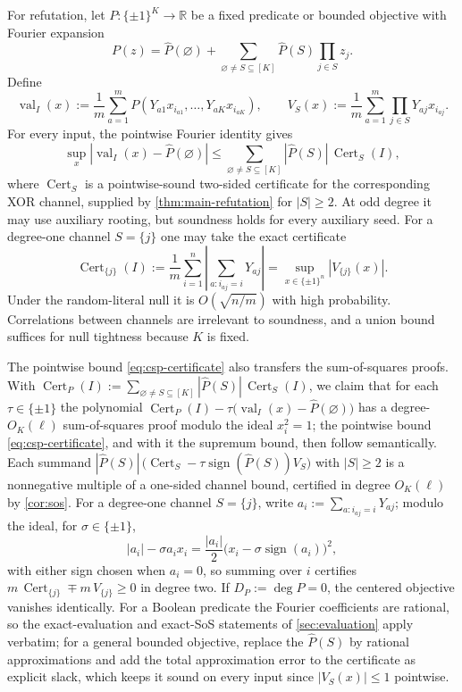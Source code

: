 \documentclass[11pt]{article}
\theoremstyle{definition}
\theoremstyle{remark}
\newcommand{\1}{\mathbf 1}
\DeclareMathOperator{\sign}{sign}
\DeclareMathOperator{\Cert}{Cert}
\DeclareMathOperator{\val}{val}
\numberwithin{equation}{section}
\begin{document}
For refutation, let $P:\{\pm1\}^K\to\mathbb R$ be a fixed predicate or
bounded objective with Fourier expansion
\begin{equation}\label{eq:predicate-fourier}
 P(z)=\widehat P(\varnothing)
 +\sum_{\varnothing\ne S\subseteq[K]}
   \widehat P(S)\prod_{j\in S}z_j.
\end{equation}
Define
\[
 \val_I(x):=\frac1m\sum_{a=1}^m
 P(Y_{a1}x_{i_{a1}},\ldots,Y_{aK}x_{i_{aK}}),
 \qquad
 V_S(x):=\frac1m\sum_{a=1}^m
 \prod_{j\in S}Y_{aj}x_{i_{aj}}.
\]
For every input, the pointwise Fourier identity gives
\begin{equation}\label{eq:csp-certificate}
 \sup_x\left|\val_I(x)-\widehat P(\varnothing)\right|
 \le\sum_{\varnothing\ne S\subseteq[K]}
       |\widehat P(S)|\,\Cert_S(I),
\end{equation}
where $\Cert_S$ is a pointwise-sound two-sided certificate for the
corresponding XOR channel, supplied by \cref{thm:main-refutation} for
$|S|\ge2$.  At odd degree it may use auxiliary rooting, but soundness holds
for every auxiliary seed.  For a degree-one channel $S=\{j\}$ one may take
the exact certificate
\begin{equation}\label{eq:degree-one-certificate}
 \Cert_{\{j\}}(I)
 :=\frac1m\sum_{i=1}^n
 \left|\sum_{a:i_{aj}=i}Y_{aj}\right|
 =\sup_{x\in\{\pm1\}^n}|V_{\{j\}}(x)|.
\end{equation}
Under the random-literal null it is $O(\sqrt{n/m})$ with high
probability.  Correlations between channels are irrelevant to soundness,
and a union bound suffices for null tightness because $K$ is fixed.

The pointwise bound \cref{eq:csp-certificate} also transfers the
sum-of-squares proofs.  With
$\Cert_P(I):=\sum_{\varnothing\ne S\subseteq[K]}
|\widehat P(S)|\,\Cert_S(I)$, we claim that for each
$\tau\in\{\pm1\}$ the polynomial
$\Cert_P(I)-\tau\bigl(\val_I(x)-\widehat P(\varnothing)\bigr)$ has a
degree-$O_K(\ell)$ sum-of-squares proof modulo the ideal $x_i^2=1$; the
pointwise bound \cref{eq:csp-certificate}, and with it the supremum
bound, then follow semantically.  Each summand
$|\widehat P(S)|\,\bigl(\Cert_S-\tau\sign(\widehat P(S))V_S\bigr)$ with
$|S|\ge2$ is a nonnegative multiple of a one-sided channel bound,
certified in degree $O_K(\ell)$ by \cref{cor:sos}.  For a degree-one
channel $S=\{j\}$, write $a_i:=\sum_{a:i_{aj}=i}Y_{aj}$; modulo the
ideal, for $\sigma\in\{\pm1\}$,
\[
 |a_i|-\sigma a_ix_i
 =\frac{|a_i|}2\bigl(x_i-\sigma\sign(a_i)\bigr)^2,
\]
with either sign chosen when $a_i=0$, so summing over $i$ certifies
$m\,\Cert_{\{j\}}\mp m\,V_{\{j\}}\ge0$ in degree two.  If
$D_P:=\deg P=0$, the centered objective vanishes identically.  For a
Boolean predicate the Fourier coefficients are rational, so the
exact-evaluation and exact-SoS statements of \cref{sec:evaluation}
apply verbatim; for a general bounded objective, replace the
$\widehat P(S)$ by rational approximations and add the total
approximation error to the certificate as explicit slack, which keeps
it sound on every input since $|V_S(x)|\le1$ pointwise.
\end{document}
